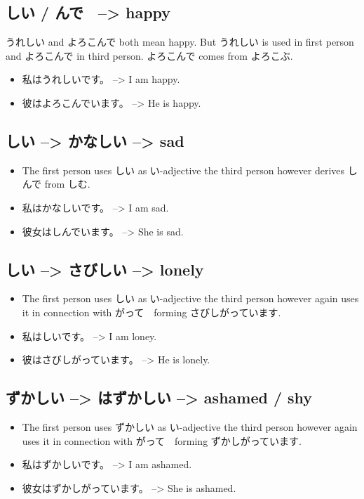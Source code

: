 \documentclass{article}
\begin{document}
\subsection{しい / んで　--> happy}
うれしい and よろこんで both mean happy. But うれしい is used in first person and よろこんで in third person.
よろこんで comes from よろこぶ.
\begin{itemize}
\item 私はうれしいです。 --> I am happy.
\item 彼はよろこんでいます。 --> He is happy.
\end{itemize}
\subsection{しい --> かなしい --> sad }
\begin{itemize}
\item The first person uses しい as い-adjective the third person however derives しんで from しむ.
\item 私はかなしいです。 --> I am sad.
\item 彼女はしんでいます。 --> She is sad.
\end{itemize}
\subsection{しい --> さびしい --> lonely }
\begin{itemize}
\item The first person uses しい as い-adjective the third person however again uses it in connection with がって　forming さびしがっています.
\item 私はしいです。 --> I am loney.
\item 彼はさびしがっています。 --> He is lonely.
\end{itemize}
\subsection{ずかしい --> はずかしい --> ashamed / shy }
\begin{itemize}
\item The first person uses ずかしい as い-adjective the third person however again uses it in connection with がって　forming ずかしがっています.
\item 私はずかしいです。 --> I am ashamed.
\item 彼女はずかしがっています。 --> She is ashamed.
\end{itemize}
\end{document}
